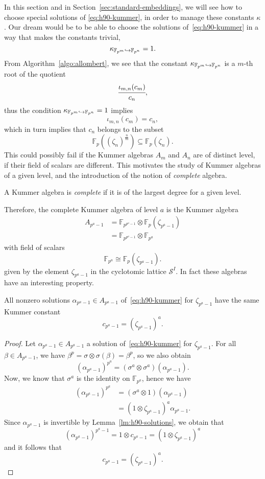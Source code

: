 In this section and in Section~\ref{sec:standard-embeddings}, we will see how to
choose special solutions of \eqref{eq:h90-kummer}, in order to manage these
constants $\kappa$. Our dream would be to be able to choose the solutions
of~\eqref{eq:h90-kummer} in a way that makes the constants trivial, \ie 
\[
  \kappa_{\mathbb{F}_{p^{m}}\hookrightarrow \mathbb{F}_{p^{n}}} = 1.
\]
From Algorithm~\ref{algo:allombert}, we see that the constant
$\kappa_{\mathbb{F}_{p^{m}}\hookrightarrow\mathbb{F}_{p^{n}}}$ is a $m$-th root of the
quotient
\[
  \cfrac{\iota_{m, n}(c_m)}{c_n},
\]
thus the condition $\kappa_{\mathbb{F}_{p^{m}}\hookrightarrow\mathbb{F}_{p^{n}}}=1$ implies
\[
  \iota_{m, n}(c_m) = c_n,
\]
which in turn implies that $c_n$ belongs to the subset
\[
  \mathbb{F}_{p}( (\zeta_n)^{\frac{n}{m}})\subseteq\mathbb{F}_p(\zeta_n).
\]
This could possibly fail if the Kummer algebras $A_m$ and $A_n$ are of distinct
level, \ie if their field of scalars are different. This motivates the study of
Kummer algebras of a given level, and the introduction of the notion of
\emph{complete} algebra.
\begin{defi}
  A Kummer algebra is \emph{complete} if it is of the largest degree for a given
  level.
\end{defi}
Therefore, the complete Kummer algebra of level $a$ is the Kummer algebra
\begin{align*}
  A_{p^a-1} &=
  \mathbb{F}_{p^{p^a-1}}\otimes\mathbb{F}_p(\zeta_{p^a-1})\\
  &=\mathbb{F}_{p^{p^a-1}}\otimes\mathbb{F}_{p^{a}}
\end{align*}
with field of scalars
\[
  \mathbb{F}_{p^{a}}\cong \mathbb{F}_p(\zeta_{p^a-1}).
\]
given by the element $\zeta_{p^a-1}$ in the cyclotomic lattice $\mathcal S^I$.
In fact these algebras have an interesting property.
\begin{lm}
  All nonzero solutions $\alpha_{p^a-1}\in A_{p^a-1}$ of~\eqref{eq:h90-kummer}
  for $\zeta_{p^a-1}$ have the same Kummer constant
  \[
    c_{p^a-1} = (\zeta_{p^a-1})^{a}.
  \]
\end{lm}
\begin{proof}
  \label{lm:complete-algebra-solutions}
  Let $\alpha_{p^a-1}\in A_{p^a-1}$ a solution of~\eqref{eq:h90-kummer} for
  $\zeta_{p^a-1}$. For all $\beta\in A_{p^a-1}$, we have $\beta^p = \sigma\otimes\sigma(\beta) =
  \beta^p$, so we also obtain 
  \[
    (\alpha_{p^a-1})^{p^a} = (\sigma^a\otimes\sigma^a)(\alpha_{p^a-1}).
  \]
  Now, we know that $\sigma^a$ is the identity on $\mathbb{F}_{p^a}$, hence we
  have
  \begin{align*}
    (\alpha_{p^a-1})^{p^a} &= (\sigma^a\otimes1)(\alpha_{p^a-1}) \\
    &= (1\otimes\zeta_{p^a-1})^a \alpha_{p^a-1}.
  \end{align*}
  Since $\alpha_{p^a-1}$ is invertible by Lemma~\ref{lm:h90-solutions}, we
  obtain that
  \[
    (\alpha_{p^a-1})^{p^a-1} = 1\otimes c_{p^a-1} = (1\otimes \zeta_{p^a-1})^a
  \]
  and it follows that
  \[
    c_{p^a-1} = (\zeta_{p^a-1})^{a}.
  \]
\end{proof}
